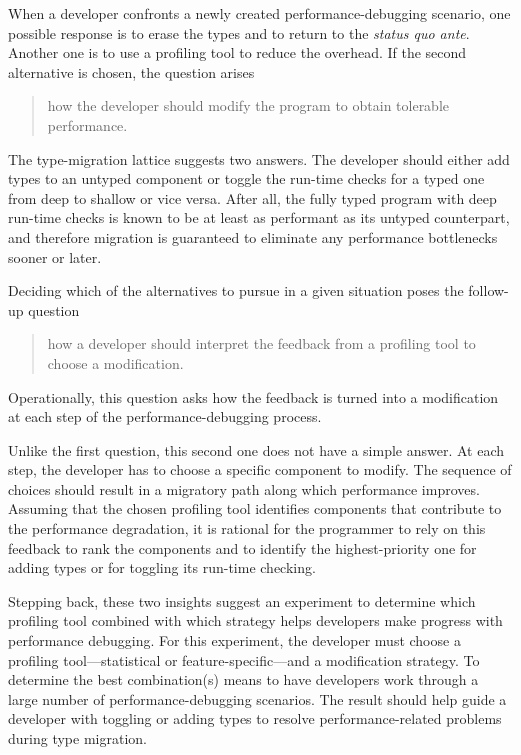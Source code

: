 
When a developer confronts a newly created performance-debugging scenario, one
possible response is to erase the types and to return to the {\em status quo
ante\/}.  Another one is to use a profiling tool to reduce the overhead. If the
second alternative is chosen, the question arises 
\begin{quote} \em

 how the developer should modify the program to obtain tolerable performance.
 
\end{quote}   
The type-migration lattice suggests two answers.  The developer should either
add types to an untyped component or toggle the run-time checks for a typed one
from deep to shallow or vice versa.  After all, the fully typed program with
deep run-time checks is known to be at least as performant as its untyped
counterpart, and therefore migration is guaranteed to eliminate any performance
bottlenecks sooner or later.

Deciding which of the alternatives to pursue in a given situation poses the
follow-up question 
\begin{quote} \em

how a developer should interpret the feedback from a profiling tool to
choose a modification.

\end{quote}   
Operationally, this question asks how the feedback is turned into a
modification at each step of the performance-debugging process.

Unlike the first question, this second one does not have a simple answer.  At
each step, the developer has to choose a specific component to modify.  The
sequence of choices should result in a migratory path along which performance
improves. Assuming that the chosen profiling tool identifies components that
contribute to the performance degradation, it is rational for the programmer to
rely on this feedback to rank the components and to identify the
highest-priority one for adding types or for toggling its run-time checking.

Stepping back, these two insights suggest an experiment to determine which
profiling tool combined with which strategy helps developers make progress with
performance debugging. For this experiment, the developer must choose a
profiling tool---statistical or feature-specific---and a modification strategy.
To determine the best combination(s) means to have developers work through a
large number of performance-debugging scenarios. The result should help guide a
developer with toggling or adding types to resolve performance-related
problems during type migration.

